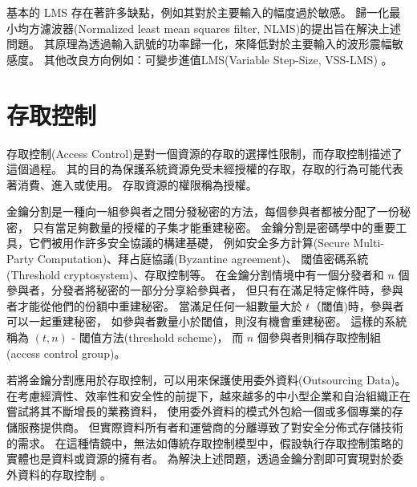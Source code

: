     基本的 LMS 存在著許多缺點，例如其對於主要輸入的幅度過於敏感。
歸一化最小均方濾波器(Normalized least mean squares filter, NLMS)的提出旨在解決上述問題。
其原理為透過輸入訊號的功率歸一化，來降低對於主要輸入的波形震幅敏感度\cite{book198585}。
其他改良方向例如：可變步進值LMS(Variable Step-Size, VSS-LMS) \cite{kwong1992variable}。


\section{存取控制}\label{section:background-access-control}

    存取控制(Access Control)是對一個資源的存取的選擇性限制\cite{rfc4949}，而存取控制描述了這個過程。
其的目的為保護系統資源免受未經授權的存取，存取的行為可能代表著消費、進入或使用。
存取資源的權限稱為授權\cite{sandhu1994access}。

    金鑰分割是一種向一組參與者之間分發秘密的方法，每個參與者都被分配了一份秘密，
只有當足夠數量的授權的子集才能重建秘密。
金鑰分割是密碼學中的重要工具，它們被用作許多安全協議的構建基礎，
例如安全多方計算(Secure Multi-Party Computation)、拜占庭協議(Byzantine agreement)、
閾值密碼系統(Threshold cryptosystem)、存取控制等\cite{beimel2011secret}。
在金鑰分割情境中有一個分發者和 $n$ 個參與者，分發者將秘密的一部分分享給參與者，
但只有在滿足特定條件時，參與者才能從他們的份額中重建秘密。
當滿足任何一組數量大於 $t$（閾值)時，參與者可以一起重建秘密，
如參與者數量小於閾值，則沒有機會重建秘密。
這樣的系統稱為 $(t , n )$ - 閾值方法(threshold scheme)，
而 $n$ 個參與者則稱存取控制組(access control group)\cite{chum2012proposed}。

    若將金鑰分割應用於存取控制，可以用來保護使用委外資料(Outsourcing Data)。
在考慮經濟性、效率性和安全性的前提下，越來越多的中小型企業和自治組織正在嘗試將其不斷增長的業務資料，
使用委外資料的模式外包給一個或多個專業的存儲服務提供商。
但實際資料所有者和運營商的分離導致了對安全分佈式存儲技術的需求。
在這種情鏡中，無法如傳統存取控制模型中，假設執行存取控制策略的實體也是資料或資源的擁有者。
為解決上述問題，透過金鑰分割即可實現對於委外資料的存取控制
\cite{naor1998access}\cite{hadavi2016access}\cite{zhang2016privacy}。